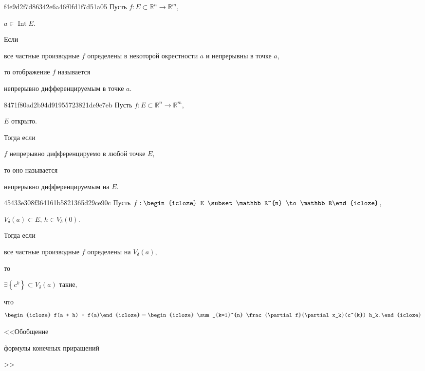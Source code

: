 \begin{note}{f4e9d2f7d86342e6a46f0fd1f7d51a05}
    Пусть \({ f : E \subset \mathbb R^{n} \to \mathbb R^{m} }\),\: \begin{icloze}{2}\({ a \in \operatorname{Int} E }\).\end{icloze}
    Если \begin{icloze}{2}все частные производные \({ f }\) определены в некоторой окрестности \({ a }\) и непрерывны в точке \({ a }\),\end{icloze} то отображение \({ f }\) называется \begin{icloze}{1}непрерывно дифференцируемым в точке \({ a }\).\end{icloze}
\end{note}

\begin{note}{8471f80ad2b94d91955723821de9e7eb}
    Пусть \({ f : E \subset \mathbb R^{n} \to \mathbb R^{m} }\),\: \begin{icloze}{3}\({ E }\) открыто.\end{icloze}
    Тогда если \begin{icloze}{2}\({ f }\) непрерывно дифференцируемо в любой точке \({ E }\),\end{icloze} то оно называется \begin{icloze}{1}непрерывно дифференцируемым на \({ E }\).\end{icloze}
\end{note}

\begin{note}{45433e308f364161b5821365d29ce90c}
    Пусть \({ f : \begin{icloze}{6}E \subset \mathbb R^{n} \to \mathbb R\end{icloze} }\),\: \begin{icloze}{5}\({ V_{\delta}(a) \subset E }\),\: \({ h \in V_{\delta}(0) }\).\end{icloze}
    Тогда если \begin{icloze}{4}все частные производные \({ f }\) определены на \({ V_{\delta}(a) }\),\end{icloze} то
    \begin{icloze}{3}\({ \exists \left\{ c^{k} \right\} \subset V_{\delta}(a) }\) такие,\end{icloze} что
    \[
        \begin{icloze}{2}f(a + h) - f(a)\end{icloze} = \begin{icloze}{1}\sum_{k=1}^{n} \frac{\partial f}{\partial x_k}(c^{k}) h_k.\end{icloze}
    \]

    \begin{center}
        \tiny
        <<Обобщение \begin{icloze}{2}формулы конечных приращений\end{icloze}>>
    \end{center}
\end{note}

